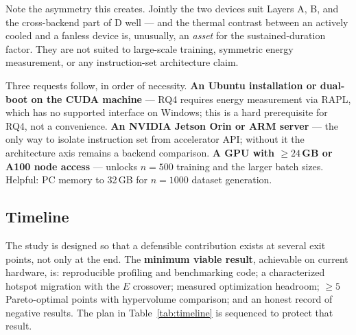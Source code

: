\documentclass[11pt,a4paper,twocolumn]{article}
\begin{document}
Note the asymmetry this creates. Jointly the two devices suit Layers A, B, and the
cross-backend part of D well --- and the thermal contrast between an actively cooled
and a fanless device is, unusually, an \emph{asset} for the sustained-duration
factor. They are not suited to large-scale training, symmetric energy measurement,
or any instruction-set architecture claim.

Three requests follow, in order of necessity. \textbf{An Ubuntu installation or
dual-boot on the CUDA machine} --- RQ4 requires energy measurement via RAPL, which
has no supported interface on Windows; this is a hard prerequisite for RQ4, not a
convenience. \textbf{An NVIDIA Jetson Orin or ARM server} --- the only way to
isolate instruction set from accelerator API; without it the architecture axis
remains a backend comparison. \textbf{A GPU with $\ge 24$\,GB or A100 node access}
--- unlocks $n{=}500$ training and the larger batch sizes. Helpful: PC memory to
32\,GB for $n{=}1000$ dataset generation.

\subsection{Timeline}

The study is designed so that a defensible contribution exists at several exit
points, not only at the end. The \textbf{minimum viable result}, achievable on
current hardware, is: reproducible profiling and benchmarking code; a characterized
hotspot migration with the $E$ crossover; measured optimization headroom; $\ge 5$
Pareto-optimal points with hypervolume comparison; and an honest record of negative
results. The plan in Table~\ref{tab:timeline} is sequenced to protect that result.
\end{document}
